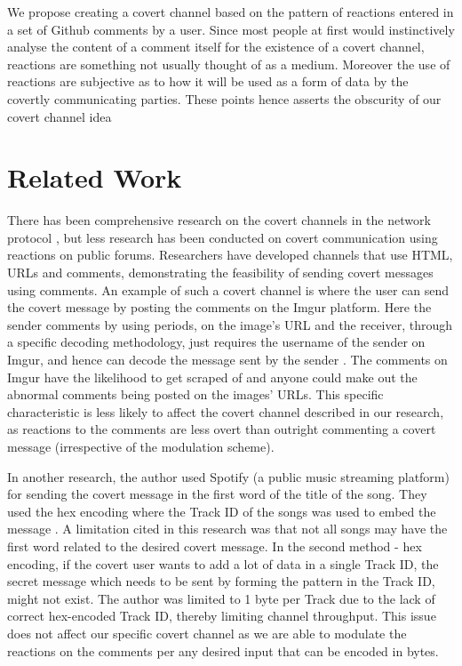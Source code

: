 \documentclass[conference]{IEEEtran}
\begin{document}
We propose creating a covert channel based on the pattern of reactions entered in a set of Github comments by a user. Since most people at first would instinctively analyse the content of a comment itself for the existence of a covert channel, reactions are something not usually thought of as a medium. Moreover the use of reactions are subjective as to how it will be used as a form of data by the covertly communicating parties. These points hence asserts the obscurity of our covert channel idea 

\section{Related Work}

There has been comprehensive research on the covert channels in the network protocol \cite{b1,b2,b3}, but less research has been conducted on covert communication using reactions on public forums. Researchers have developed channels that use HTML, URLs and comments, demonstrating the feasibility of sending covert messages using comments. An example of such a covert channel is where the user can send the covert message by posting the comments on the Imgur platform. Here the sender comments by using periods, on the image’s URL and the receiver, through a specific decoding methodology, just requires the username of the sender on Imgur, and hence can decode the message sent by the sender \cite{b4}. The comments on Imgur have the likelihood to get scraped of and anyone could make out the abnormal comments being posted on the images’ URLs. This specific characteristic is less likely to affect the covert channel described in our research, as reactions to the comments are less overt than outright commenting a covert message (irrespective of the modulation scheme).

In another research, the author used Spotify (a public music streaming platform) for sending the covert message in the first word of the title of the song. They used the hex encoding where the Track ID of the songs was used to embed the message \cite{b5}. A limitation cited in this research was that not all songs may have the first word related to the desired covert message. In the second method - hex encoding, if the covert user wants to add a lot of data in a single Track ID, the secret message which needs to be sent by forming the pattern in the Track ID, might not exist. The author was limited to 1 byte per Track due to the lack of correct hex-encoded Track ID, thereby limiting channel throughput. This issue does not affect our specific covert channel as we are able to modulate the reactions on the comments per any desired input that can be encoded in bytes.
\end{document}
